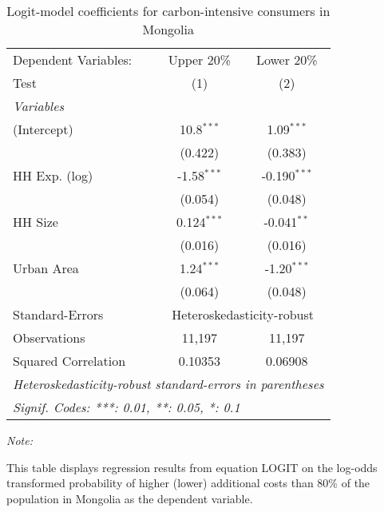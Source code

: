 
\begin{table}[htbp!]
   \centering
   \small
   \begin{adjustbox}{width = 1\textwidth, max height = 0.95\textheight, center}
      \begin{threeparttable}[b]
         \caption{\label{tab:Logit_1_MNG} Logit-model coefficients for carbon-intensive consumers in Mongolia}
         \begin{tabular}{lcc}
            \tabularnewline \midrule \midrule
            Dependent Variables: & Upper 20\%    & Lower 20\%\\   
            Test                 & (1)           & (2)\\  
            \midrule
            \emph{Variables}\\
            (Intercept)          & 10.8$^{***}$  & 1.09$^{***}$\\   
                                 & (0.422)       & (0.383)\\   
            HH Exp. (log)        & -1.58$^{***}$ & -0.190$^{***}$\\   
                                 & (0.054)       & (0.048)\\   
            HH Size              & 0.124$^{***}$ & -0.041$^{**}$\\   
                                 & (0.016)       & (0.016)\\   
            Urban Area           & 1.24$^{***}$  & -1.20$^{***}$\\   
                                 & (0.064)       & (0.048)\\   
            \midrule 
            Standard-Errors & \multicolumn{2}{c}{Heteroskedasticity-robust} \\ 
            Observations         & 11,197        & 11,197\\  
            Squared Correlation  & 0.10353       & 0.06908\\  
            \midrule \midrule
            \multicolumn{3}{l}{\emph{Heteroskedasticity-robust standard-errors in parentheses}}\\
            \multicolumn{3}{l}{\emph{Signif. Codes: ***: 0.01, **: 0.05, *: 0.1}}\\
         \end{tabular}
         
         \begin{tablenotes}\item \medskip \textit{Note:}
            \item This table displays regression results from equation LOGIT on the log-odds transformed probability of higher (lower) additional costs than 80\% of the population in Mongolia as the dependent variable. 
         \end{tablenotes}
      \end{threeparttable}
   \end{adjustbox}
\end{table}


